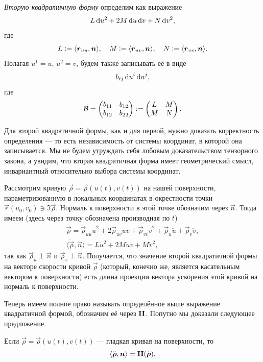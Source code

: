 \begin{definition}
	\textit{Вторую квадратичную форму} определим как выражение
	\[
		L\d u^2 + 2M\d u\d v + N\d v^2,
	\]
	где
	\[
		L \vcentcolon = \langle\vec{r}_{uu}, \vec{n}\rangle,\quad M \vcentcolon = \langle\vec{r}_{uv}, \vec{n}\rangle,\quad N \vcentcolon = \langle\vec{r}_{vv}, \vec{n}\rangle.
	\]
	Полагая $u^1 = u$, $u^2 = v$, будем также записывать её в виде
	\[
		b_{ij}\d u^i\d u^j,
	\]
	где
	\[
		\B = \begin{pmatrix}
			b_{11} & b_{12}\\
			b_{12} & b_{22}
		\end{pmatrix} \vcentcolon =
		\begin{pmatrix}
			L & M\\
			M & N
		\end{pmatrix}.
	\]
\end{definition}

Для второй квадратичной формы, как и для первой, нужно доказать корректность определения --- то есть независимость от системы координат, в которой она записывается. Мы не будем утруждать себя лобовым доказательством тензорного закона, а увидим, что вторая квадратичная форма имеет геометрический смысл, инвариантный относительно выбора системы координат.

Рассмотрим кривую $\vec{\rho} = \vec{\rho}(u(t), v(t))$ на нашей поверхности, параметризованную в локальных координатах в окрестности точки $\vec{r}(u_0, v_0) \ni \Im\vec{\rho}$. Нормаль к поверхности в этой точке обозначим через $\vec{n}$. Тогда имеем (здесь через точку обозначена производная по $t$)
\begin{gather*}
	\ddot{\vec{\rho}} = \vec{\rho}_{uu}\dot{u}^2 + 2\vec{\rho}_{uv}\dot{u}\dot{v} + \vec{\rho}_{vv}\dot{v}^2 + \vec{\rho}_u\ddot{u} + \vec{\rho}_v\ddot{v},\\
	\langle\ddot{\vec{\rho}}, \vec{n}\rangle = L\dot{u}^2 + 2M\dot{u}\dot{v} + M\dot{v}^2,
\end{gather*}
так как $\vec{\rho}_u \perp \vec{n}$ и $\vec{\rho}_v \perp \vec{n}$. Получается, что значение второй квадратичной формы на векторе скорости кривой $\vec{\rho}$ (который, конечно же, является касательным вектором к поверхности) есть длина проекции вектора ускорения этой кривой на нормаль к поверхности.

Теперь имеем полное право называть определённое выше выражение квадратичной формой, обозначим её через $\II$. Попутно мы доказали следующее предложение.

\begin{proposition} \label{proposition:GeomII}
	Если $\vec{\rho} = \vec{\rho}(u(t), v(t))$ --- гладкая кривая на поверхности, то
	\[
		\langle\ddot{\vec{\rho}}, \vec{n}\rangle = \II(\dot{\vec{\rho}}).
	\]
\end{proposition}

